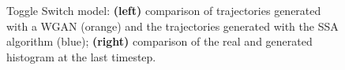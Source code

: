 \documentclass{article}
\begin{document}
\begin{figure}[ht]
    \centering
    \caption{Toggle Switch model: \textbf{(left)} comparison of trajectories generated with a WGAN (orange) and the trajectories generated with the SSA algorithm (blue); \textbf{(right)} comparison of the real and generated histogram at the last timestep.}
    \label{fig:ts_trajectories}
\end{figure}
\end{document}
